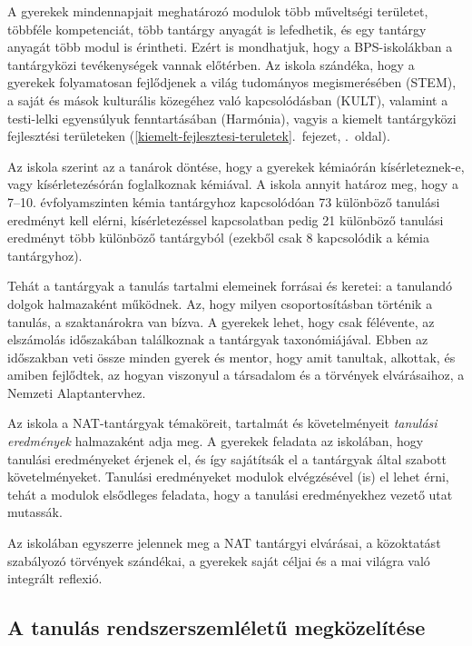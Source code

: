 A gyerekek mindennapjait meghatározó modulok több műveltségi területet,
többféle kompetenciát, több tantárgy anyagát is lefedhetik, és egy
tantárgy anyagát több modul is érintheti. Ezért is mondhatjuk, hogy a
BPS-iskolákban a tantárgyközi tevékenységek vannak előtérben. Az iskola
szándéka, hogy a gyerekek folyamatosan fejlődjenek a világ tudományos
megismerésében (STEM), a saját és mások kulturális közegéhez való
kapcsolódásban (KULT), valamint a testi-lelki egyensúlyuk fenntartásában
(Harmónia), vagyis a
kiemelt tantárgyközi fejlesztési területeken (\ref{kiemelt-fejlesztesi-teruletek}.~fejezet, \pageref{kiemelt-fejlesztesi-teruletek}.~oldal).

Az iskola szerint az a tanárok döntése, hogy a gyerekek kémiaórán
kísérleteznek-e, vagy kísérletezésórán foglalkoznak kémiával. A iskola\break
annyit határoz meg, hogy a 7--10. évfolyamszinten kémia tantárgyhoz
kapcsolódóan 73 különböző tanulási eredményt kell elérni,
kísérletezéssel\break
kapcsolatban pedig 21 különböző tanulási eredményt több
különböző tantárgyból (ezekből csak 8 kapcsolódik a kémia tantárgyhoz).

Tehát a tantárgyak a tanulás tartalmi elemeinek forrásai és keretei: a
tanulandó dolgok halmazaként működnek. Az, hogy milyen csoportosításban
történik a tanulás, a szaktanárokra van bízva. A gyerekek lehet, hogy
csak félévente, az elszámolás időszakában találkoznak a tantárgyak
taxonómiájával. Ebben az időszakban veti össze minden gyerek és mentor,
hogy amit tanultak, alkottak, és amiben fejlődtek, az hogyan viszonyul a
társadalom és a törvények elvárásaihoz, a Nemzeti Alaptantervhez.

Az iskola a NAT-tantárgyak témaköreit, tartalmát és követelményeit
\emph{tanulási eredmények} halmazaként adja meg. A gyerekek feladata az
iskolában, hogy tanulási eredményeket érjenek el, és így sajátítsák el a
tantárgyak által szabott követelményeket. Tanulási eredményeket modulok
elvégzésével (is) el lehet érni, tehát a modulok elsődleges feladata,
hogy a tanulási eredményekhez vezető utat mutassák.

Az iskolában egyszerre jelennek meg a NAT tantárgyi elvárásai, a
közoktatást szabályozó törvények szándékai, a gyerekek saját céljai és a
mai világra való integrált reflexió.

\hypertarget{a-tanulas-rendszerszemleletu-megkozelitese}{%
\subsection{A tanulás rendszerszemléletű
megközelítése}\label{a-tanulas-rendszerszemleletu-megkozelitese}}

